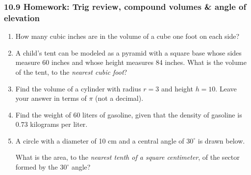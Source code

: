 \documentclass[12pt, twoside]{article}
\begin{document}
\subsubsection*{10.9 Homework: Trig review, compound volumes \& angle of elevation}
 \begin{enumerate}

  \item How many cubic inches are in the volume of a cube one foot on each side?

  \item A child’s tent can be modeled as a pyramid with a square base whose sides measure 60 inches and whose height measures 84 inches. What is the volume of the tent, to the \emph{nearest cubic foot}?

  \item Find the volume of a cylinder with radius $r=3$ and height $h=10$. Leave your answer in terms of $\pi$ (not a decimal). \vspace{2.5cm}

  \item Find the weight of $60$ liters of gasoline, given that the density of gasoline is $0.73$ kilograms per liter. \vspace{3.0cm}

  \item A circle with a diameter of 10 cm and a central angle of $30^\circ$ is drawn below.
       \begin{center}
     \end{center}
  What is the area, to the \emph{nearest tenth of a square centimeter}, of the sector formed by the $30^\circ$ angle?


\end{enumerate}
\end{document}

